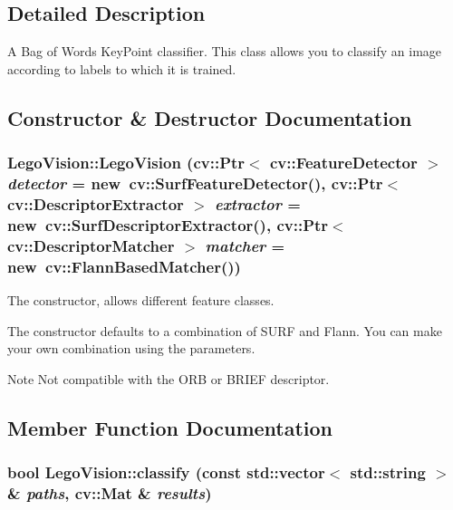 \subsection{Detailed Description}
A Bag of Words KeyPoint classifier. This class allows you to classify an image according to labels to which it is trained. 

\subsection{Constructor \& Destructor Documentation}
\hypertarget{classLegoVision_ae9612e1c30be7bc41ce92335b35eb729}{
\subsubsection[{LegoVision}]{\setlength{\rightskip}{0pt plus 5cm}LegoVision::LegoVision (cv::Ptr$<$ cv::FeatureDetector $>$ {\em detector} = {\ttfamily new~cv::SurfFeatureDetector()}, \/  cv::Ptr$<$ cv::DescriptorExtractor $>$ {\em extractor} = {\ttfamily new~cv::SurfDescriptorExtractor()}, \/  cv::Ptr$<$ cv::DescriptorMatcher $>$ {\em matcher} = {\ttfamily new~cv::FlannBasedMatcher()})}}
\label{classLegoVision_ae9612e1c30be7bc41ce92335b35eb729}


The constructor, allows different feature classes. 

The constructor defaults to a combination of SURF and Flann. You can make your own combination using the parameters.

\begin{DoxyNote}{Note}
Not compatible with the ORB or BRIEF descriptor. 
\end{DoxyNote}


\subsection{Member Function Documentation}
\hypertarget{classLegoVision_aab8d7ac39a37e2e8f901ca774793854b}{
\subsubsection[{classify}]{\setlength{\rightskip}{0pt plus 5cm}bool LegoVision::classify (const std::vector$<$ std::string $>$ \& {\em paths}, \/  cv::Mat \& {\em results})}}
\label{classLegoVision_aab8d7ac39a37e2e8f901ca774793854b}



